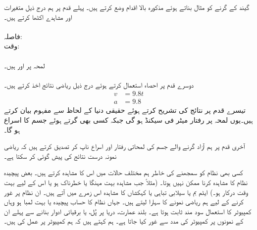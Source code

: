 گیند کے گرنے کو مثال بناتے ہوئے مذکورہ بالا اقدام وضع کرتے ہیں۔ پہلے قدم پر ہم درج ذیل متغیرات اور مشاہدے اکٹھا  کرتے ہیں۔\\
\\
فاصلہ:\quad {}\\
وقت:\quad {}\\
\\
لمحہ  پر  اور  ہیں۔\\
\quad {}\\
دوسرے قدم پر احصاء استعمال کرتے ہوئے درج ذیل ریاضی نتائج اخذ کرتے ہیں۔
\begin{align*}
v&=9.8t\\
a&=9.8
\end{align*}
تیسرے قدم پر نتائج کی تشریح کرتے ہوئے حقیقی دنیا کے لحاظ سے مفہوم بیان کرتے ہیں۔یوں لمحہ  پر رفتار  میٹر فی سیکنڈ ہو گی جبکہ کسی بھی گرتے ہوئے جسم کا اسراع  ہو گا۔ 

آخری قدم پر ہم آزاد  گرنے والے جسم  کی لمحاتی رفتار اور اسراع ناپ کر تصدیق کرتے ہیں کہ ریاضی نمونہ درست نتائج کی پیش گوئی کر سکتا ہے۔

کسی بھی نظام کو سمجھنے کی خاطر ہم مختلف حالات میں اس کا مشاہدہ کرتے ہیں۔ بعض پیچیدہ نظام کا  مشاہدہ کرنا ممکن نہیں ہوتا۔ (مثلاً جب  مشاہدہ بہت مہنگا یا خطرناک ہو یا اس کے لیے بہت وقت درکار ہو۔) ایٹم بم یا سیلابی تباہی یا کہکشاں کا مشاہدہ  اس زمرے میں آتے ہیں۔ ان نظام پر غور کرنے کے لیے ہم ریاضی نمونے کا سہارا لیتے ہیں۔ جہاں نظام کا حساب پیچیدہ یا بہت لمبا ہو وہاں کمپیوٹر کا استعمال سود مند ثابت ہوتا ہے۔ بلند عمارت، دریا پر پُل، یا برقیاتی ادوار بنانے سے پہلے ان کے نمونوں پر کمپیوٹر کی مدد سے غور کیا جاتا ہے۔ ہم کہتے ہیں کہ ہم کمپیوٹر پر عمل کی  ہیں۔

